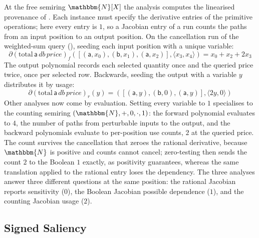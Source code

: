 At the free semiring $\mathbbm{N}[X]$ the analysis computes the linearised provenance of
. Each instance must specify the derivative entries of the
primitive operations; here every entry is $1$, so a Jacobian entry of a run counts the paths from an input
position to an output position. On the cancellation run of the weighted-sum query
(), seeding each input position with a unique variable:
\begin{displaymath}
  \partial(\mathrm{total}\,\mathsf{a}\,\mathit{db}\,\mathit{price})_f([(\mathsf{a}, x_0), (\mathsf{b}, x_1), (\mathsf{a}, x_2)], \langle x_3, x_4 \rangle) = x_0 + x_2 + 2 x_3
\end{displaymath}
\noindent The output polynomial records each selected quantity once and the queried price twice, once
per selected row. Backwards, seeding the output with a variable $y$ distributes it by usage:
\begin{displaymath}
  \partial(\mathrm{total}\,\mathsf{a}\,\mathit{db}\,\mathit{price})_r(y) =
  ([(\mathsf{a}, y), (\mathsf{b}, 0), (\mathsf{a}, y)], \langle 2 y, 0 \rangle)
\end{displaymath}
\noindent Other analyses now come by evaluation. Setting every variable to $1$ specialises to the
counting semiring $(\mathbbm{N}, +, 0, \cdot, 1)$: the forward polynomial evaluates to $4$, the number of
paths from perturbable inputs to the output, and the backward polynomials evaluate to per-position use counts,
$2$ at the queried price. The count survives the cancellation that zeroes the rational derivative, because
$\mathbbm{N}$ is positive and counts cannot cancel; zero-testing then sends the count $2$ to the Boolean $1$
exactly, as positivity guarantees, whereas the same translation applied to the rational entry loses the
dependency. The three analyses answer three different questions at the same position: the rational Jacobian
reports sensitivity ($0$), the Boolean Jacobian possible dependence ($1$), and the counting Jacobian usage
($2$).

\subsection{Signed Saliency}
\label{sec:examples:saliency}

